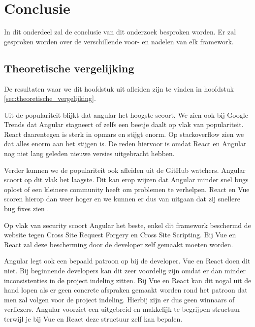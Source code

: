 
\chapter{Conclusie}
\label{ch:conclusie}

In dit onderdeel zal de conclusie van dit onderzoek besproken worden. Er zal gesproken worden over de verschillende voor- en nadelen van elk framework.

\section{Theoretische vergelijking}

De resultaten waar we dit hoofdstuk uit afleiden zijn te vinden in hoofdstuk \ref{sec:theoretische_vergelijking}.

Uit de populariteit blijkt dat angular het hoogste scoort. We zien ook bij Google Trends \autocite{_google_2018} dat Angular stagneert of zelfs een beetje daalt op vlak van populariteit. React daarentegen is sterk in opmars en stijgt enorm. Op stackoverflow \autocite{_stackoverflow_2018} zien we dat alles enorm aan het stijgen is. De reden hiervoor is omdat React en Angular nog niet lang geleden nieuwe versies uitgebracht hebben.

Verder kunnen we de populariteit ook afleiden uit de GitHub watchers. Angular scoort op dit vlak het laagste. Dit kan erop wijzen dat Angular minder snel bugs oplost of een kleinere community heeft om problemen te verhelpen. React en Vue scoren hierop dan weer hoger en we kunnen er dus van uitgaan dat zij snellere bug fixes zien \autocite{github_front-end_????}.

Op vlak van security scoort Angular het beste, enkel dit framework beschermd de website tegen Cross Site Request Forgery en Cross Site Scripting. Bij Vue en React zal deze bescherming door de developer zelf gemaakt moeten worden.

Angular legt ook een bepaald patroon op bij de developer. Vue en React doen dit niet. Bij beginnende developers kan dit zeer voordelig zijn omdat er dan minder inconsistenties in de project indeling zitten. Bij Vue en React kan dit nogal uit de hand lopen als er geen concrete afspraken gemaakt worden rond het patroon dat men zal volgen voor de project indeling. Hierbij zijn er dus geen winnaars of verliezers. Angular voorziet een uitgebreid en makkelijk te begrijpen structuur terwijl je bij Vue en React deze structuur zelf kan bepalen.

